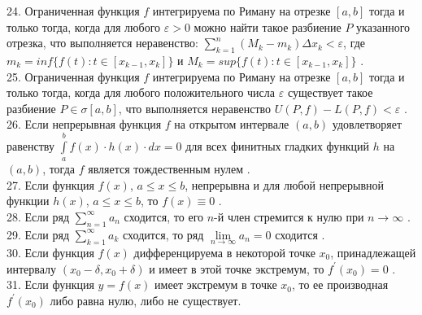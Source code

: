 \documentclass[12pt]{article}
\begin{document}
24. Ограниченная функция ${\displaystyle f}$ интегрируема по Риману на отрезке ${\displaystyle [a,b]}$ тогда и только тогда, когда для любого ${\displaystyle \varepsilon>0}$ можно найти такое разбиение ${\displaystyle P}$ указанного отрезка, что выполняется неравенство: ${\displaystyle \sum \limits _{k=1}^{n} (M_k-m_k)\Delta x_k<\varepsilon}$, где ${\displaystyle m_k=inf \{f(t):t\in[x_{k-1},x_k]\}}$ и ${\displaystyle M_k=sup \{f(t):t\in[x_{k-1},x_k]\}}$ .\\

25. Ограниченная функция ${\displaystyle f}$  интегрируема по Риману на отрезке ${\displaystyle [a,b]}$ тогда и только тогда, когда для любого положительного числа ${\displaystyle \varepsilon}$ существует такое разбиение ${\displaystyle P\in \sigma[a,b]}$, что выполняется неравенство ${\displaystyle U(P,f) - L(P,f) < \varepsilon}$ .\\

26. Если непрерывная функция ${\displaystyle f}$ на открытом интервале ${\displaystyle (a,b)}$ удовлетворяет равенству ${\displaystyle \int \limits _{a}^{b} f(x)\cdot h(x)\cdot dx=0}$ для всех финитных гладких функций ${\displaystyle h}$ на ${\displaystyle (a,b)}$, тогда ${\displaystyle f}$ является тождественным нулем .\\

27. Если функция  ${\displaystyle f(x)}$,  ${\displaystyle a \leq x \leq b}$, непрерывна и для любой непрерывной функции  ${\displaystyle h(x)}$, ${\displaystyle a \leq x \leq b}$, то  ${\displaystyle f(x) \equiv 0}$ .\\

28. Если ряд ${\displaystyle \sum \limits _{n=1}^{\infty} a_n}$ сходится, то его ${\displaystyle n}$-й член стремится к нулю при ${\displaystyle n \to \infty}$ .\\

29. Если ряд ${\displaystyle \sum \limits _{k=1}^{\infty} a_k}$ сходится, то ряд ${\displaystyle \lim \limits _{n \to \infty} a_n=0}$ сходится .\\

30. Если функция ${\displaystyle f(x)}$ дифференцируема в некоторой точке  ${\displaystyle x_0}$, принадлежащей интервалу ${\displaystyle (x_0-\delta,x_0+\delta)}$ и имеет в этой точке экстремум, то ${\displaystyle f^{\prime}(x_0)=0}$ .\\

31. Если функция ${\displaystyle y=f(x)}$ имеет экстремум в точке ${\displaystyle x_0}$, то ее производная ${\displaystyle f^{\prime}(x_0)}$ либо равна нулю, либо не существует.\\
\end{document}
